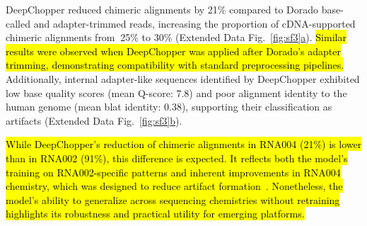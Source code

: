 \documentclass[pdflatex,sn-nature, lineno]{sn-jnl}%
\newcommand{\edfigref}[2]{Extended Data Fig.~\hyperref[#1]{\ref*{#1}#2}}
\begin{document}
DeepChopper reduced chimeric alignments by 21\% compared to Dorado base-called and adapter-trimmed reads, increasing the proportion of cDNA-supported chimeric alignments from $~$25\% to 30\% (\edfigref{fig:sf3}{a}).
\hl{Similar results were observed when DeepChopper was applied after Dorado's adapter trimming, demonstrating compatibility with standard preprocessing pipelines.}
Additionally, internal adapter-like sequences identified by DeepChopper exhibited low base quality scores (mean Q-score: 7.8) and poor alignment identity to the human genome (mean \gls{blat} identity: 0.38), supporting their classification as artifacts (\edfigref{fig:sf3}{b}).

\hl{While DeepChopper’s reduction of chimeric alignments in RNA004 (21\%) is lower than in RNA002 (91\%), this difference is expected.
	It reflects both the model’s training on RNA002-specific patterns and inherent improvements in RNA004 chemistry, which was designed to reduce artifact formation\mbox{~\cite{hewel2024direct}}. Nonetheless, the model’s ability to generalize across sequencing chemistries without retraining highlights its robustness and practical utility for emerging platforms.}
\end{document}
